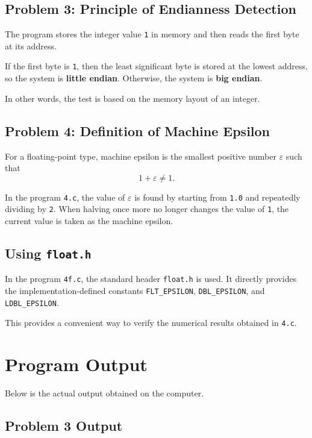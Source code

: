 \documentclass[12pt,a4paper]{article}
\begin{document}
\subsection*{Problem 3: Principle of Endianness Detection}

The program stores the integer value \texttt{1} in memory and then reads the first byte at its address.

If the first byte is \texttt{1}, then the least significant byte is stored at the lowest address, so the system is \textbf{little endian}. Otherwise, the system is \textbf{big endian}.

In other words, the test is based on the memory layout of an integer.

\subsection*{Problem 4: Definition of Machine Epsilon}

For a floating-point type, machine epsilon is the smallest positive number \(\varepsilon\) such that
\[
1 + \varepsilon \neq 1.
\]

In the program \texttt{4.c}, the value of \(\varepsilon\) is found by starting from \texttt{1.0} and repeatedly dividing by \texttt{2}. When halving once more no longer changes the value of \texttt{1}, the current value is taken as the machine epsilon.

\subsection*{Using \texttt{float.h}}

In the program \texttt{4f.c}, the standard header \texttt{float.h} is used. It directly provides the implementation-defined constants
\texttt{FLT\_EPSILON}, \texttt{DBL\_EPSILON}, and \texttt{LDBL\_EPSILON}.

This provides a convenient way to verify the numerical results obtained in \texttt{4.c}.

\section{Program Output}

Below is the actual output obtained on the computer.

\subsection*{Problem 3 Output}
\end{document}
